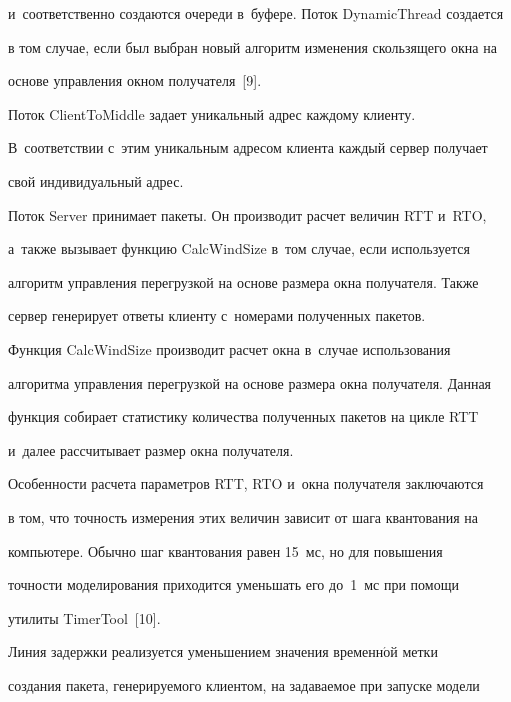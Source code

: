 и~соответственно создаются очереди в~буфере. Поток DynamicThread создается


в том случае, если был выбран новый алгоритм изменения скользящего окна на


основе управления окном получателя~[9].





  Поток ClientToMiddle задает уникальный адрес каждому клиенту.


В~соответствии с~этим уникальным адресом клиента каждый сервер получает


свой индивидуальный адрес.





  Поток Server принимает пакеты. Он производит расчет величин RTT и~RTO,


а~также вызывает функцию CalcWindSize в~том случае, если используется


алгоритм управления перегрузкой на основе размера окна получателя. Также


сервер генерирует ответы клиенту с~номерами полученных пакетов.





  Функция CalcWindSize производит расчет окна в~случае использования


алгоритма управления перегрузкой на основе размера окна получателя. Данная


функция собирает статистику количества полученных пакетов на цикле RTT


и~далее рассчитывает размер окна получателя.





  Особенности расчета параметров RTT, RTO и~окна получателя заключаются


в том, что точность измерения этих величин зависит от шага квантования на


компьютере. Обычно шаг квантования равен 15~мс, но для повышения


точности моделирования приходится уменьшать его до~1~мс при помощи


утилиты TimerTool~[10].





  Линия задержки реализуется уменьшением значения временн$\acute{\mbox{о}}$й метки


создания пакета, генерируемого клиентом, на задаваемое при запуске модели


